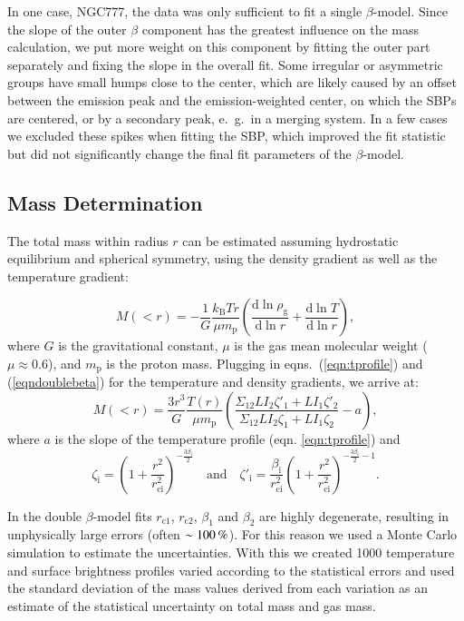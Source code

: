 \documentclass[structabstract]{aa}
\begin{document}
In one case, NGC777, the data was only sufficient to fit a single
$\beta$-model. Since the slope of the outer $\beta$ component has the
greatest influence on the mass calculation, we put more weight on this
component by fitting the outer part separately and fixing the slope in
the overall fit. Some irregular or asymmetric groups have small humps
close to the center, which are likely caused by an offset between the
emission peak and the emission-weighted center, on which the SBPs are
centered, or by a secondary peak, e.\ g.\ in a merging system. In a
few cases we excluded these spikes when fitting the SBP, which
improved the fit statistic but did not significantly change the final
fit parameters of the $\beta$-model.
%
\subsection{Mass Determination}\label{masses}
The total mass within radius $r$ can be estimated assuming hydrostatic equilibrium and
spherical symmetry, using the density gradient as well as the
temperature gradient:

\begin{equation} \label{eqnHyEq}
M(<r)=-\frac{1}{G} \frac{k_{\text{B}} T r}{\mu m_{\text{p}}} \left(\frac{\text{d} \ln \rho_{\text{g}}}{\text{d} \ln r} + \frac{\text{d} \ln T}{\text{d}\ln r}\right),
\end{equation}
where $G$ is the gravitational constant, $\mu$ is the gas mean
molecular weight ($\mu \approx 0.6$), and $m_{\text{p}}$ is the proton
mass. Plugging in eqns.\ (\ref{eqn:tprofile}) and (\ref{eqndoublebeta}) for the temperature and density gradients, we arrive at:
\begin{equation} \label{eqndoubletotalmass}
 M(<r)=\frac{3r^3}{G} \frac{T(r)}{\mu m_{\text{p}}} \left(\frac{\Sigma_{12} LI_2 \zeta'_1 + LI_1 \zeta'_2}{\Sigma_{12}LI_2 \zeta_1 + LI_1 \zeta_2}-a\right) ,
\end{equation}
where $a$ is the slope of the temperature profile (eqn. \ref{eqn:tprofile}) and
\begin{equation}
 \zeta_{\text{i}}= \left( 1 +\frac{r^2}{r_{\text{ci}}^2}\right)^{-\frac{3\beta_{\text{i}}}{2}}\quad \text{and}\quad \zeta'_{\text{i}}=\frac{\beta_{\text{i}}}{r_{\text{ci}}^2}\left(1+\frac{r^2}{r_{\text{ci}}^2}\right)^{-\frac{3\beta_{\text{i}}}{2}-1}.
\end{equation}

In the double $\beta$-model fits $r_{\text{c1}}$, $r_{\text{c2}}$,
$\beta_1$ and $\beta_2$ are highly degenerate, resulting in
unphysically large errors (often $\sim \unit[100]{\%}$). For this
reason we used a Monte Carlo simulation to estimate the
  uncertainties. With this we created 1000 temperature and surface
  brightness profiles varied according to the statistical errors and
  used the standard deviation of the mass values derived from each
  variation as an estimate of the statistical uncertainty on total
  mass and gas mass.
 
\end{document}
